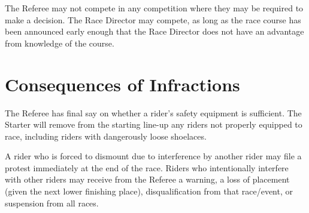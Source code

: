 The Referee may not compete in any competition where they may be required to make a decision.
The Race Director may compete, as long as the race course has been announced early enough that the Race Director does not have an advantage from knowledge of the course.

\section{Consequences of Infractions}

The Referee has final say on whether a rider's safety equipment is sufficient.
The Starter will remove from the starting line-up any riders not properly equipped to race, including riders with dangerously loose shoelaces.

A rider who is forced to dismount due to interference by another rider may file a protest immediately at the end of the race.
Riders who intentionally interfere with other riders may receive from the Referee a warning, a loss of placement (given the next lower finishing place), disqualification from that race/event, or suspension from all races.
